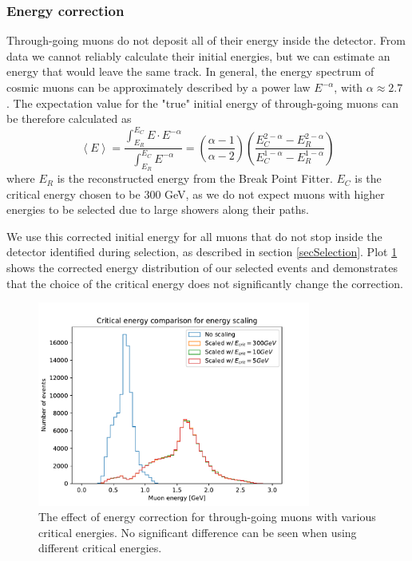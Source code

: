 \documentclass[12pt]{article}
\begin{document}
\subsubsection{Energy correction}
Through-going muons do not deposit all of their energy inside the detector. From data we cannot reliably calculate their initial energies, but we can estimate an energy that would leave the same track. In general, the energy spectrum of cosmic muons can be approximately described by a power law $E^{-\alpha}$, with $\alpha\approx2.7$ \cite{NOVA-doc-51327-v3,rpp2022-rev-cosmic-rays.pdf}. The expectation value for the "true" initial energy of through-going muons can be therefore calculated as
\begin{equation}
\left\langle E\right\rangle =\frac{\int^{E_C}_{E_R} E\cdot E^{-\alpha}}{\int^{E_C}_{E_R} E^{-\alpha}}=\left(\frac{\alpha -1}{\alpha -2}\right)\left(\frac{E_C^{2-\alpha}-E_R^{2-\alpha}}{E_C^{1-\alpha}-E_R^{1-\alpha}}\right)
\end{equation}
where $E_R$ is the reconstructed energy from the Break Point Fitter. $E_C$ is the critical energy chosen to be 300 GeV, as we do not expect muons with higher energies to be selected due to large showers along their paths.

We use this corrected initial energy for all muons that do not stop inside the detector identified during selection, as described in section \ref{secSelection}. Plot \ref{figEnergyScaling} shows the corrected energy distribution of our selected events and demonstrates that the choice of the critical energy does not significantly change the correction. 

\begin{figure}[hbtp]
\centering
\includegraphics[width=0.8\textwidth]{ECritComparison.pdf}
\caption{The effect of energy correction for through-going muons with various critical energies. No significant difference can be seen when using different critical energies.}
\label{figEnergyScaling}
\end{figure}
\end{document}
